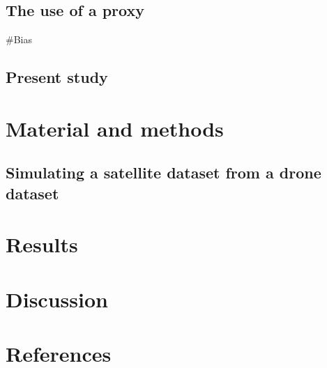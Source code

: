 \documentclass[
  letterpaper,
  DIV=11,
  numbers=noendperiod]{scrartcl}
\begin{document}
\subsection{The use of a proxy}\label{the-use-of-a-proxy}

\#Bias

\subsection{Present study}\label{present-study}

\section{Material and methods}\label{material-and-methods}

\subsection{Simulating a satellite dataset from a drone
dataset}\label{simulating-a-satellite-dataset-from-a-drone-dataset}

\section{Results}\label{results}

\section{Discussion}\label{discussion}

\section*{References}\label{references}
\end{document}
